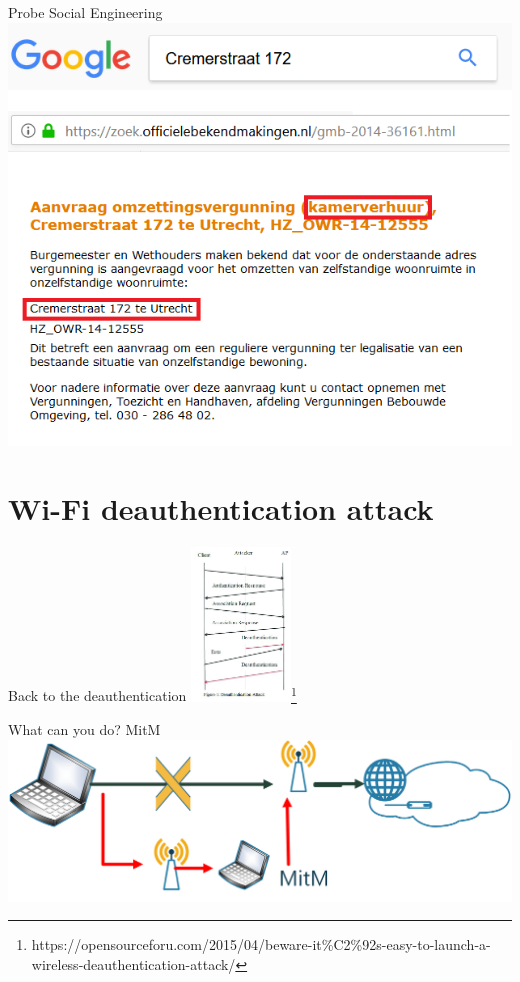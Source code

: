 \documentclass[10pt]{beamer}
\begin{document}
\begin{frame}{Probe Social Engineering}
\centering
\includegraphics[width=\textwidth]{omzet.png}
\end{frame}

\section{Wi-Fi deauthentication attack}
\begin{frame}{Back to the deauthentication}
\centering
\includegraphics[width=100px]{dewifi.jpg}\footnote{\tiny{https://opensourceforu.com/2015/04/beware-it\%C2\%92s-easy-to-launch-a-wireless-deauthentication-attack/}}
\end{frame}

\begin{frame}{What can you do? MitM}
\centering
\includegraphics[width=\textwidth]{MinM.png}
\end{frame}
\end{document}

